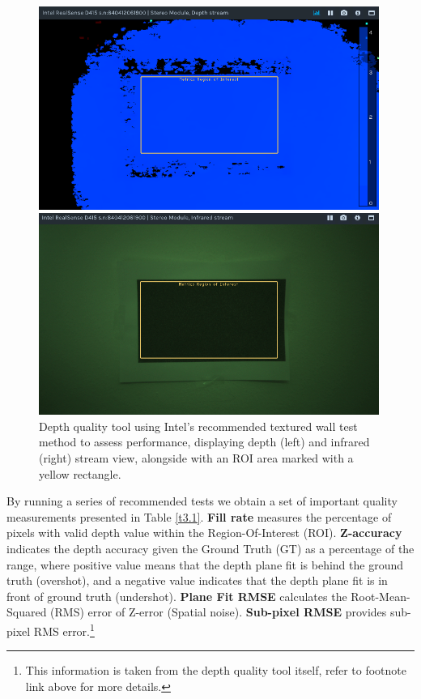 \begin{figure}
  \begin{minipage}{.49\textwidth}
    \centering
    \includegraphics[width=0.99\textwidth]{Figures/Pictures/dc.png}
  \end{minipage}
  \begin{minipage}{.49\textwidth}
    \centering
    \includegraphics[width=0.99\textwidth]{Figures/Pictures/ic.png}
  \end{minipage}
  \caption{Depth quality tool using Intel's recommended textured wall test method to assess performance, displaying depth (left) and infrared (right) stream view, alongside with an ROI area marked with a yellow rectangle.}
  \label{f3.2}
\end{figure}

By running a series of recommended tests we obtain a set of important quality measurements presented in Table \ref{t3.1}. \textbf{Fill rate} measures the percentage of pixels with valid depth value within the Region-Of-Interest (ROI). \textbf{Z-accuracy} indicates the depth accuracy given the Ground Truth (GT) as a percentage of the range, where positive value means that the depth plane fit is behind the ground truth (overshot), and a negative value indicates that the depth plane fit is in front of ground truth (undershot). \textbf{Plane Fit RMSE} calculates the Root-Mean-Squared (RMS) error of Z-error (Spatial noise). \textbf{Sub-pixel RMSE} provides sub-pixel RMS error.\footnote{This information is taken from the depth quality tool itself, refer to footnote link above for more details.} 


